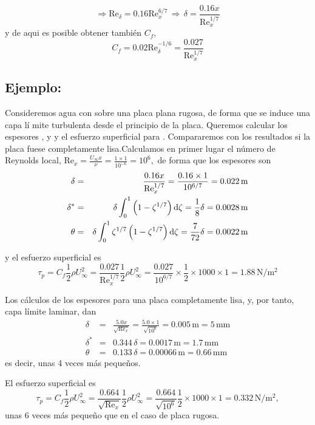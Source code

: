 	\[
	\Rightarrow\text{Re}_{\delta}=0.16\text{Re}_{x}^{6/7}\,\Rightarrow\,\boxed{\delta=\frac{0.16x}{\text{Re}_{x}^{1/7}}}
	\]
	y de aqui es posible obtener también $C_{f}$, 
	\[
	C_{f}=0.02\text{Re}_{\delta}^{-1/6}=\frac{0.027}{\text{Re}_{x}^{1/7}}
	\]
	

	
	\subsection*{Ejemplo:}
		Consideremos agua con  sobre una placa plana rugosa, de forma que
		se induce una capa lí mite turbulenta desde el principio de la placa.
		Queremos calcular los espesores ,  y  y el esfuerzo superficial para
		. Compararemos con los resultados si la placa fuese completamente
		lisa.Calculamos en primer lugar el número de Reynolds local, $\text{Re}_{x}=\frac{U_{\infty}x}{\nu}=\frac{1\times1}{10^{-6}}=10^{6},$
		de forma que los espesores son 
		\begin{eqnarray*}
			\delta & = & \frac{0.16x}{\text{Re}_{x}^{1/7}}=\frac{0.16\times1}{10^{6/7}}=0.022\,\text{m}\\
			\delta^{*} & = & \delta\int_{0}^{1}\left(1-\zeta^{1/7}\right)\text{d}\zeta=\frac{1}{8}\delta=0.0028\,\text{m}\\
			\theta & = & \delta\int_{0}^{1}\zeta^{1/7}\left(1-\zeta^{1/7}\right)\text{d}\zeta=\frac{7}{72}\delta=0.0022\,\text{m}
		\end{eqnarray*}

		y el esfuerzo superficial es {\small{}
			\[
			\tau_{p}=C_{f}\frac{1}{2}\rho U_{\infty}^{2}=\frac{0.027}{\text{Re}_{x}^{1/7}}\frac{1}{2}\rho U_{\infty}^{2}=\frac{0.027}{10^{6/7}}\times\frac{1}{2}\times{1000}\times{1}=1.88\,\text{N}/\text{m}^{2}
			\]
		}
		
		Los cálculos de los espesores para una placa completamente lisa,
		y, por tanto, capa límite laminar, dan {\small{}
			\begin{eqnarray*}
				\delta & = & \frac{5.0x}{\sqrt{\text{Re}_{x}}}=\frac{5.0\times1}{\sqrt{10^{6}}}=0.005\,\text{m}=5\,\text{mm}\\
				\delta^{*} & = & 0.344\,\delta=0.0017\,\text{m}=1.7\,\text{mm}\\
				\theta & = & 0.133\,\delta=0.00066\,\text{m}=0.66\,\text{mm}
			\end{eqnarray*}
		} es decir, unas 4 veces más pequeños.
		
		El esfuerzo superficial es {\small{}
			\[
			\tau_{p}=C_{f}\frac{1}{2}\rho U_{\infty}^{2}=\frac{0.664}{\sqrt{\text{Re}_{x}}}\frac{1}{2}\rho U_{\infty}^{2}=\frac{0.664}{\sqrt{10^{6}}}\frac{1}{2}\times1000\times1=0.332\,\text{N}/\text{m}^{2},
			\]
		} unas 6 veces más pequeño que en el caso de placa rugosa.

